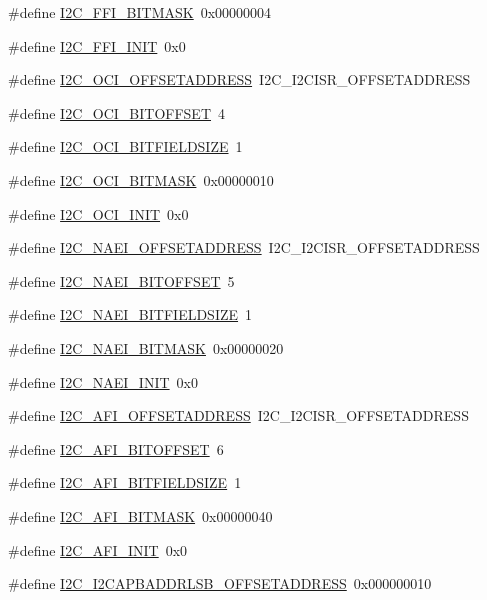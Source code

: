 \begin{DoxyCompactItemize}
\item 
\#define \hyperlink{a00558_a54ef419f95a50c65ae4c453bf53c07d4}{I2C\_\-FFI\_\-BITMASK}~0x00000004
\item 
\#define \hyperlink{a00558_ad3b44ec095f515d4ac4ff798cca62457}{I2C\_\-FFI\_\-INIT}~0x0
\item 
\#define \hyperlink{a00558_a07eeaa62355d88b241d6d9c0b26c7e51}{I2C\_\-OCI\_\-OFFSETADDRESS}~I2C\_\-I2CISR\_\-OFFSETADDRESS
\item 
\#define \hyperlink{a00558_a7600ab560fbcc1f54603e4e7a7a0eef3}{I2C\_\-OCI\_\-BITOFFSET}~4
\item 
\#define \hyperlink{a00558_a54b769402e2a2277531507e6509c8d4a}{I2C\_\-OCI\_\-BITFIELDSIZE}~1
\item 
\#define \hyperlink{a00558_aadcc94e4e98b3760c0fed26c2c7d1907}{I2C\_\-OCI\_\-BITMASK}~0x00000010
\item 
\#define \hyperlink{a00558_a47114cbce4cc3c2b557c42b686a20337}{I2C\_\-OCI\_\-INIT}~0x0
\item 
\#define \hyperlink{a00558_a9b86c5bdfaa6716519e71fd9c95aed99}{I2C\_\-NAEI\_\-OFFSETADDRESS}~I2C\_\-I2CISR\_\-OFFSETADDRESS
\item 
\#define \hyperlink{a00558_a69d8f81fc886c422d8d8a4cf5985a5c4}{I2C\_\-NAEI\_\-BITOFFSET}~5
\item 
\#define \hyperlink{a00558_a16a4029d2be924da5b0bb3e13500e727}{I2C\_\-NAEI\_\-BITFIELDSIZE}~1
\item 
\#define \hyperlink{a00558_a001c8ca8e454a95222b230795b93d984}{I2C\_\-NAEI\_\-BITMASK}~0x00000020
\item 
\#define \hyperlink{a00558_a4fe4d9da3233b3332c110cfa9616f55a}{I2C\_\-NAEI\_\-INIT}~0x0
\item 
\#define \hyperlink{a00558_ab95593af0244945884376d1e24489df0}{I2C\_\-AFI\_\-OFFSETADDRESS}~I2C\_\-I2CISR\_\-OFFSETADDRESS
\item 
\#define \hyperlink{a00558_a0ab883af6618163f1b0298c83cef5d44}{I2C\_\-AFI\_\-BITOFFSET}~6
\item 
\#define \hyperlink{a00558_a316c7cd44acf0ab5bd69b1252fb6b531}{I2C\_\-AFI\_\-BITFIELDSIZE}~1
\item 
\#define \hyperlink{a00558_a613693e037f3e581be188774a57de38d}{I2C\_\-AFI\_\-BITMASK}~0x00000040
\item 
\#define \hyperlink{a00558_a474eaae345f458884e975ae797f1c9da}{I2C\_\-AFI\_\-INIT}~0x0
\item 
\#define \hyperlink{a00558_acd82e4d5cc8d095a80eacc163baf5efb}{I2C\_\-I2CAPBADDRLSB\_\-OFFSETADDRESS}~0x000000010

\end{DoxyCompactItemize}
